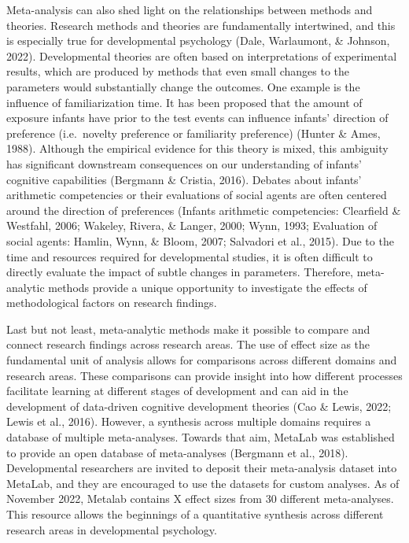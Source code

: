 \documentclass[10pt, letterpaper]{article}
\begin{document}
Meta-analysis can also shed light on the relationships between methods
and theories. Research methods and theories are fundamentally
intertwined, and this is especially true for developmental psychology
(Dale, Warlaumont, \& Johnson, 2022). Developmental theories are often
based on interpretations of experimental results, which are produced by
methods that even small changes to the parameters would substantially
change the outcomes. One example is the influence of familiarization
time. It has been proposed that the amount of exposure infants have
prior to the test events can influence infants' direction of preference
(i.e.~novelty preference or familiarity preference) (Hunter \& Ames,
1988). Although the empirical evidence for this theory is mixed, this
ambiguity has significant downstream consequences on our understanding
of infants' cognitive capabilities (Bergmann \& Cristia, 2016). Debates
about infants' arithmetic competencies or their evaluations of social
agents are often centered around the direction of preferences (Infants
arithmetic competencies: Clearfield \& Westfahl, 2006; Wakeley, Rivera,
\& Langer, 2000; Wynn, 1993; Evaluation of social agents: Hamlin, Wynn,
\& Bloom, 2007; Salvadori et al., 2015). Due to the time and resources
required for developmental studies, it is often difficult to directly
evaluate the impact of subtle changes in parameters. Therefore,
meta-analytic methods provide a unique opportunity to investigate the
effects of methodological factors on research findings.

Last but not least, meta-analytic methods make it possible to compare
and connect research findings across research areas. The use of effect
size as the fundamental unit of analysis allows for comparisons across
different domains and research areas. These comparisons can provide
insight into how different processes facilitate learning at different
stages of development and can aid in the development of data-driven
cognitive development theories (Cao \& Lewis, 2022; Lewis et al., 2016).
However, a synthesis across multiple domains requires a database of
multiple meta-analyses. Towards that aim, MetaLab was established to
provide an open database of meta-analyses (Bergmann et al., 2018).
Developmental researchers are invited to deposit their meta-analysis
dataset into MetaLab, and they are encouraged to use the datasets for
custom analyses. As of November 2022, Metalab contains X effect sizes
from 30 different meta-analyses. This resource allows the beginnings of
a quantitative synthesis across different research areas in
developmental psychology.
\end{document}
